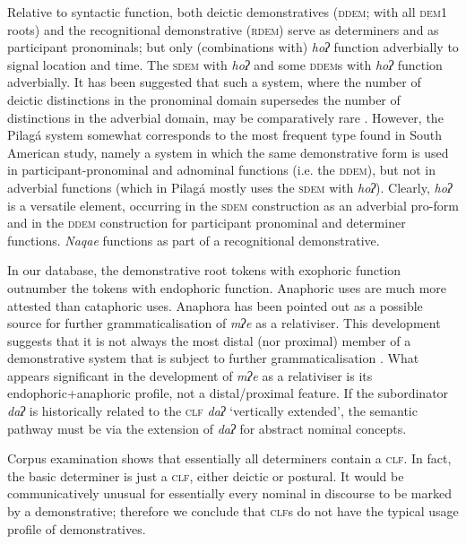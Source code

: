 \documentclass[output=paper,colorlinks,citecolor=brown]{langscibook}
\begin{document}
Relative to syntactic function, both deictic demonstratives (\textsc{ddem;} with all \textsc{dem1} roots) and the recognitional demonstrative (\textsc{rdem)} serve as determiners and as participant pronominals; but only (combinations with) \textit{hoʔ} function adverbially to signal location and time. The \textsc{sdem} with \textit{hoʔ} and some \textsc{ddem}s with \textit{hoʔ} function adverbially. It has been suggested that such a system, where the number of deictic distinctions in the pronominal domain supersedes the number of distinctions in the adverbial domain, may be comparatively rare \citep[19]{Levinson2018}. However, the Pilagá system somewhat corresponds to the most frequent type found in  South American study, namely a system in which the same demonstrative form is used in participant-pronominal and adnominal functions (i.e. the \textsc{ddem}), but not in adverbial functions (which in Pilagá mostly uses the \textsc{sdem} with \textit{hoʔ}). Clearly, \textit{hoʔ} is a versatile element, occurring in the \textsc{sdem} construction as an adverbial pro-form and in the \textsc{ddem} construction for participant pronominal and determiner functions. \textit{Naqae} functions as part of a recognitional demonstrative. 

In our database, the demonstrative root tokens with exophoric function outnumber the tokens with endophoric function. Anaphoric uses are much more attested than cataphoric uses. Anaphora has been pointed out as a possible source for further grammaticalisation of \textit{mʔe} as a relativiser. This development suggests that it is not always the most distal (nor proximal) member of a demonstrative system that is subject to further grammaticalisation \citep[217]{Himmelmann1996}. What appears significant in the development of \textit{mʔe} as a relativiser is its endophoric+anaphoric profile, not a distal/proximal feature. If the subordinator \textit{daʔ} is historically related to the \textsc{clf} \textit{daʔ} ‘vertically extended’, the semantic pathway must be via the extension of \textit{daʔ} for abstract nominal concepts.

Corpus examination shows that essentially all determiners contain a \textsc{clf}. In fact, the basic determiner is just a \textsc{clf}, either deictic or postural. It would be communicatively unusual for essentially every nominal in discourse to be marked by a demonstrative; therefore we conclude that \textsc{clf}s do not have the typical usage profile of demonstratives.
\end{document}
